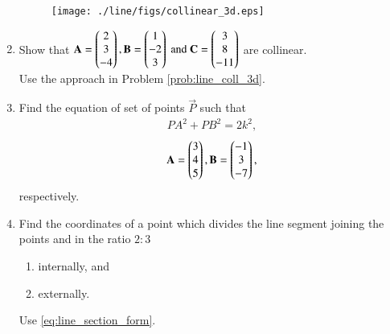 \begin{enumerate}[label=\arabic*.,ref=\thesubsection.\theenumi]
%
\begin{figure}[!ht]
\texttt{[image: ./line/figs/collinear\_3d.eps]}
\caption{}
\label{fig:collinear_3d}
\end{figure}
%
\item Show that 
$
\mathbf{A}=\begin{pmatrix}2\\3\\-4\end{pmatrix}, 
\mathbf{B}=\begin{pmatrix}1\\-2\\3\end{pmatrix} \text{ and } 
\mathbf{C}=\begin{pmatrix}3\\8\\-11\end{pmatrix}$  
are collinear.
%
\\
\solution Use the approach in Problem \eqref{prob:line_coll_3d}.
%
\item Find the equation of set of points $\vec{P}$ such that
\begin{align}
PA^2+PB^2 =2k^2,
\end{align}
%
\begin{align}
\mathbf{A} = \begin{pmatrix}3\\4 \\5\end{pmatrix},
\mathbf{B} = \begin{pmatrix}-1\\3 \\-7\end{pmatrix},
\end{align}
%
respectively.
%
\item Find the coordinates of a point which divides the line segment joining the points  and  in the ratio $2:3$
\begin{enumerate}
\item internally, and
\item externally.
\end{enumerate}
%
\solution Use \eqref{eq:line_section_form}.


\end{enumerate}
